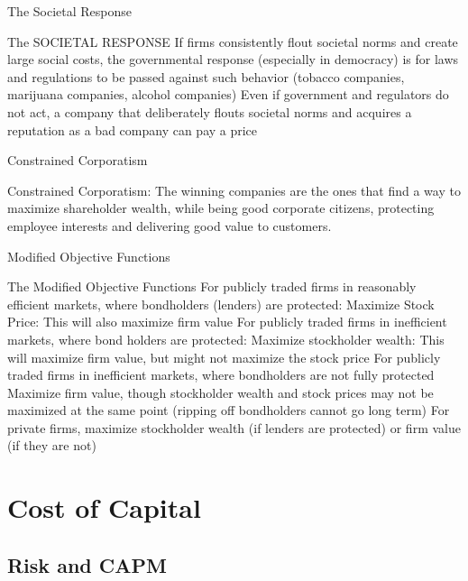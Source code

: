 \documentclass[10pt]{article}
\begin{document}
    \begin{core}{The Societal Response}

      The SOCIETAL RESPONSE
      If firms consistently flout societal norms and create large social costs, the governmental response (especially in democracy) is for laws and regulations to be passed against such behavior (tobacco companies, marijuana companies, alcohol companies)
      Even if government and regulators do not act, a company that deliberately flouts societal norms and acquires a reputation as a bad company can pay a price

    \end{core}

    \begin{core}{Constrained Corporatism}

      Constrained Corporatism: The winning companies are the ones that find a way to maximize shareholder wealth, while being good corporate citizens, protecting employee interests and delivering good value to customers.

    \end{core}

    \begin{core}{Modified Objective Functions}
      
      The Modified Objective Functions
      For publicly traded firms in reasonably efficient markets, where bondholders (lenders) are protected:
      Maximize Stock Price: This will also maximize firm value
      For publicly traded firms in inefficient markets, where bond holders are protected:
      Maximize stockholder wealth: This will maximize firm value, but might not maximize the stock price
      For publicly traded firms in inefficient markets, where bondholders are not fully protected
      Maximize firm value, though stockholder wealth and stock prices may not be maximized at the same point (ripping off bondholders cannot go long term)
      For private firms, maximize stockholder wealth (if lenders are protected) or firm value (if they are not)

    \end{core}

\section{Cost of Capital}

  \subsection{Risk and CAPM}
  
\end{document}
